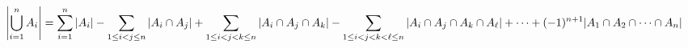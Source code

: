 \documentclass[preview]{standalone}
\begin{document}
\begin{align*}
\special{dvisvgm:raw <g id='unique000'>}\left|\bigcup_{i=1}^{n} A_i\right|= \sum_{i=1}^{n} |A_i| - \sum_{1 \le i < j \le n} |A_i \cap A_j| + \sum_{1 \le i < j < k \le n} |A_i \cap A_j \cap A_k| - \sum_{1 \le i < j < k < \ell \le n} |A_i \cap A_j \cap A_k \cap A_\ell| + \cdots + (-1)^{n+1} |A_1 \cap A_2 \cap \cdots \cap A_n|\special{dvisvgm:raw </g>}
\end{align*}
\end{document}
